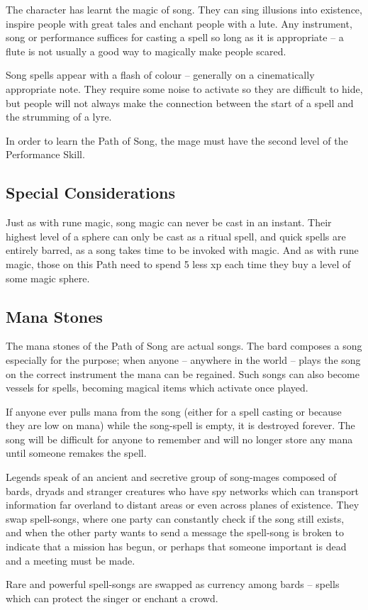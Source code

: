 \begin{multicols}{2}

The character has learnt the magic of song. They can sing illusions into existence, inspire people with great tales and enchant people with a lute. Any instrument, song or performance suffices for casting a spell so long as it is appropriate -- a flute is not usually a good way to magically make people scared.

Song spells appear with a flash of colour -- generally on a cinematically appropriate note. They require some noise to activate so they are difficult to hide, but people will not always make the connection between the start of a spell and the strumming of a lyre.

In order to learn the Path of Song, the mage must have the second level of the Performance Skill. 

\subsection{Special Considerations}

Just as with rune magic, song magic can never be cast in an instant.  Their highest level of a sphere can only be cast as a ritual spell, and quick spells are entirely barred, as a song takes time to be invoked with magic.  And as with rune magic, those on this Path need to spend 5 less \gls{xp} each time they buy a level of some magic sphere.

\subsection{Mana Stones}

The mana stones of the Path of Song are actual songs. The bard composes a song especially for the purpose; when anyone -- anywhere in the world -- plays the song on the correct instrument the mana can be regained. Such songs can also become vessels for spells, becoming magical items which activate once played.

If anyone ever pulls mana from the song (either for a spell casting or because they are low on mana) while the song-spell is empty, it is destroyed forever. The song will be difficult for anyone to remember and will no longer store any mana until someone remakes the spell.

Legends speak of an ancient and secretive group of song-mages composed of bards, dryads and stranger creatures who have spy networks which can transport information far overland to distant areas or even across planes of existence. They swap spell-songs, where one party can constantly check if the song still exists, and when the other party wants to send a message the spell-song is broken to indicate that a mission has begun, or perhaps that someone important is dead and a meeting must be made.

Rare and powerful spell-songs are swapped as currency among bards -- spells which can protect the singer or enchant a crowd.

\end{multicols}


